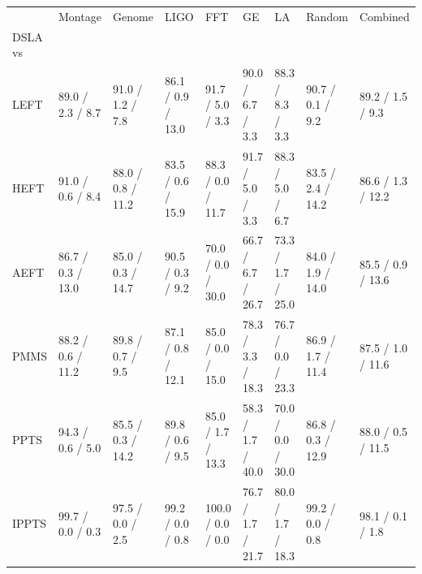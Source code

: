 \begin{tabular}{lllllllll}
\toprule
 & Montage & Genome & LIGO & FFT & GE & LA & Random & Combined \\
DSLA vs &  &  &  &  &  &  &  &  \\
\midrule
LEFT & 89.0 / 2.3 / 8.7 & 91.0 / 1.2 / 7.8 & 86.1 / 0.9 / 13.0 & 91.7 / 5.0 / 3.3 & 90.0 / 6.7 / 3.3 & 88.3 / 8.3 / 3.3 & 90.7 / 0.1 / 9.2 & 89.2 / 1.5 / 9.3 \\
HEFT & 91.0 / 0.6 / 8.4 & 88.0 / 0.8 / 11.2 & 83.5 / 0.6 / 15.9 & 88.3 / 0.0 / 11.7 & 91.7 / 5.0 / 3.3 & 88.3 / 5.0 / 6.7 & 83.5 / 2.4 / 14.2 & 86.6 / 1.3 / 12.2 \\
AEFT & 86.7 / 0.3 / 13.0 & 85.0 / 0.3 / 14.7 & 90.5 / 0.3 / 9.2 & 70.0 / 0.0 / 30.0 & 66.7 / 6.7 / 26.7 & 73.3 / 1.7 / 25.0 & 84.0 / 1.9 / 14.0 & 85.5 / 0.9 / 13.6 \\
PMMS & 88.2 / 0.6 / 11.2 & 89.8 / 0.7 / 9.5 & 87.1 / 0.8 / 12.1 & 85.0 / 0.0 / 15.0 & 78.3 / 3.3 / 18.3 & 76.7 / 0.0 / 23.3 & 86.9 / 1.7 / 11.4 & 87.5 / 1.0 / 11.6 \\
PPTS & 94.3 / 0.6 / 5.0 & 85.5 / 0.3 / 14.2 & 89.8 / 0.6 / 9.5 & 85.0 / 1.7 / 13.3 & 58.3 / 1.7 / 40.0 & 70.0 / 0.0 / 30.0 & 86.8 / 0.3 / 12.9 & 88.0 / 0.5 / 11.5 \\
IPPTS & 99.7 / 0.0 / 0.3 & 97.5 / 0.0 / 2.5 & 99.2 / 0.0 / 0.8 & 100.0 / 0.0 / 0.0 & 76.7 / 1.7 / 21.7 & 80.0 / 1.7 / 18.3 & 99.2 / 0.0 / 0.8 & 98.1 / 0.1 / 1.8 \\
\bottomrule
\end{tabular}
